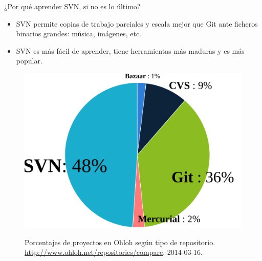 \documentclass[xcolor=svgnames]{beamer}
\begin{document}
\begin{frame}{¿Por qué aprender SVN, si no es lo último?}

  \begin{itemize}
  \item SVN permite copias de trabajo parciales y escala mejor que Git
    ante ficheros binarios grandes: música, imágenes, etc.
  \item SVN es más fácil de aprender, tiene herramientas más maduras y es más popular.
  \end{itemize}

  \begin{figure}
    \centering
    \includegraphics[width=.8\textwidth,height=.5\textheight,keepaspectratio]{compare-repos-ohloh}

    \small Porcentajes de proyectos en Ohloh según tipo de
    repositorio. \url{http://www.ohloh.net/repositories/compare},
    2014-03-16.
  \end{figure}

\end{frame}
\end{document}
